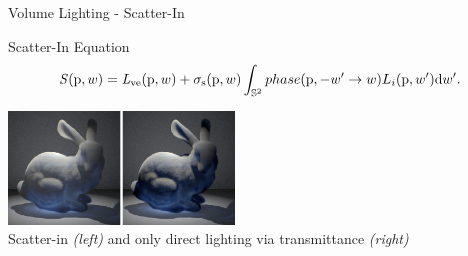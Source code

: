\documentclass[10pt,compress,professionalfont]{beamer}
\begin{document}
\begin{frame}{Volume Lighting - Scatter-In}

    \begin{block}{Scatter-In Equation}
        \[
            \mathit{S}(\textup{p},w) = \mathit{L}_{\textup{ve}}(\textup{p},w) + \sigma_{\textup{s}}(\textup{p}, w) \int_{\mathbb{S}^2} phase(\textup{p}, -w' \to w) L_{i}(\textup{p},w')\textup{d}w'.
        \]
    \end{block}
    {\centering
    \vspace{8mm}
    \includegraphics[width=60mm]{../img/inscat_comp}\\
    {\centering\scriptsize Scatter-in \textit{(left)} and only direct lighting via transmittance \textit{(right)}\\}
    }

\end{frame}



\end{document}
